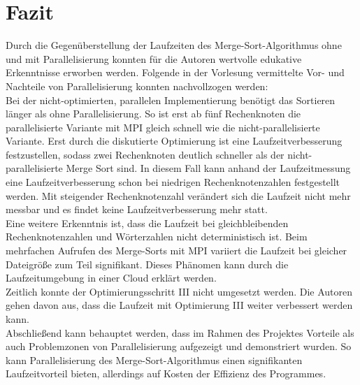 \section{Fazit}
Durch die Gegenüberstellung der Laufzeiten des Merge-Sort-Algorithmus ohne und mit Parallelisierung konnten für die Autoren wertvolle edukative Erkenntnisse erworben werden. Folgende in der Vorlesung vermittelte Vor- und Nachteile von Parallelisierung konnten nachvollzogen werden:
\\
Bei der nicht-optimierten, parallelen Implementierung benötigt das Sortieren länger als ohne Parallelisierung. So ist erst ab fünf Rechenknoten die parallelisierte Variante mit MPI gleich schnell wie die nicht-parallelisierte Variante. Erst durch die diskutierte Optimierung ist eine Laufzeitverbesserung festzustellen, sodass zwei Rechenknoten deutlich schneller als der nicht-parallelisierte Merge Sort sind. In diesem Fall kann anhand der Laufzeitmessung eine Laufzeitverbesserung schon bei niedrigen Rechenknotenzahlen festgestellt werden. Mit steigender Rechenknotenzahl verändert sich die Laufzeit nicht mehr messbar und es findet keine Laufzeitverbesserung mehr statt.\\
Eine weitere Erkenntnis ist, dass die Laufzeit bei gleichbleibenden Rechenknotenzahlen und Wörterzahlen nicht deterministisch ist. Beim mehrfachen Aufrufen des Merge-Sorts mit MPI variiert die Laufzeit bei gleicher Dateigröße zum Teil signifikant. Dieses Phänomen kann durch die Laufzeitumgebung in einer Cloud erklärt werden.\\
Zeitlich konnte der Optimierungsschritt III nicht umgesetzt werden. Die Autoren gehen davon aus, dass die Laufzeit mit Optimierung III weiter verbessert werden kann.
\\
Abschließend kann behauptet werden, dass im Rahmen des Projektes Vorteile als auch Problemzonen von Parallelisierung aufgezeigt und demonstriert wurden. So kann Parallelisierung des Merge-Sort-Algorithmus einen signifikanten Laufzeitvorteil bieten, allerdings auf Kosten der Effizienz des Programmes.